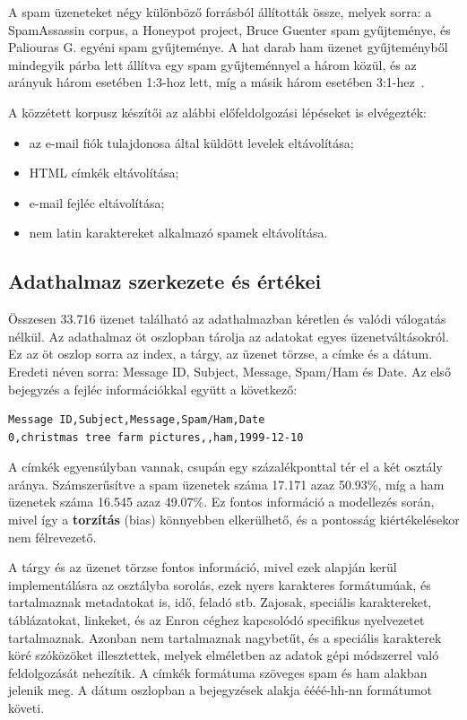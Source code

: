A spam üzeneteket négy különböző forrásból állították össze, melyek sorra: a SpamAssassin corpus, a Honeypot project,
Bruce Guenter spam gyűjteménye, és Paliouras G. egyéni spam gyűjteménye. A hat darab ham üzenet gyűjteményből mindegyik párba lett állítva egy spam gyűjteménnyel a három közül,
és az arányuk három esetében 1:3-hoz lett, míg a másik három esetében 3:1-hez~\cite{inproceedings}.

A közzétett korpusz készítői az alábbi előfeldolgozási lépéseket is elvégezték:
\begin{itemize}
\item az e-mail fiók tulajdonosa által küldött levelek eltávolítása;
\item HTML címkék eltávolítása;
\item e-mail fejléc eltávolítása;
\item nem latin karaktereket alkalmazó spamek eltávolítása.
\end{itemize}

\subsection{Adathalmaz szerkezete és értékei}

Összesen 33.716 üzenet található az adathalmazban kéretlen és valódi válogatás nélkül.
Az adathalmaz öt oszlopban tárolja az adatokat egyes üzenetváltásokról. Ez az öt oszlop sorra az index, a tárgy, az üzenet törzse, a címke és a dátum. 
Eredeti néven sorra: Message ID, Subject, Message, Spam/Ham és Date. Az első bejegyzés a fejléc információkkal együtt a következő: 

\begin{verbatim}
Message ID,Subject,Message,Spam/Ham,Date
0,christmas tree farm pictures,,ham,1999-12-10
\end{verbatim}

A címkék egyensúlyban vannak, csupán egy százalékponttal tér el a két osztály aránya. Számszerűsítve a spam üzenetek száma 17.171 azaz 50.93\%, 
míg a ham üzenetek száma 16.545 azaz 49.07\%. Ez fontos információ a modellezés során, mivel így a \textbf{torzítás} (bias) könnyebben elkerülhető,
és a pontosság kiértékelésekor nem félrevezető. 

A tárgy és az üzenet törzse fontos információ, mivel ezek alapján kerül implementálásra az osztályba sorolás, ezek nyers karakteres formátumúak, 
és tartalmaznak metadatokat is, idő, feladó stb. Zajosak, speciális karaktereket, táblázatokat, linkeket, és az Enron céghez kapcsolódó specifikus nyelvezetet tartalmaznak. 
Azonban nem tartalmaznak nagybetűt, és a speciális karakterek köré szóközöket illesztettek, melyek elméletben az adatok gépi módszerrel való feldolgozását nehezítik.
A címkék formátuma szöveges spam és ham alakban jelenik meg. A dátum oszlopban a bejegyzések alakja éééé-hh-nn formátumot követi. 

